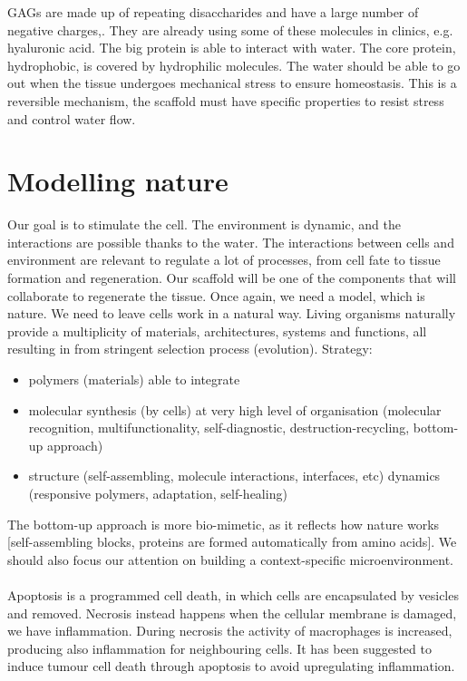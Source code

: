 \noindent
GAGs are made up of repeating disaccharides and have a large number of negative charges,.
They are already using some of these molecules in clinics, e.g. hyaluronic acid.
The big protein is able to interact with water.
The core protein, hydrophobic, is covered by hydrophilic molecules.
The water should be able to go out when the tissue undergoes mechanical stress to ensure homeostasis.
This is a reversible mechanism,  the scaffold must have specific properties to resist stress and control water flow.

\section{Modelling nature}
Our goal is to stimulate the cell.
The environment is dynamic, and the interactions are possible thanks to the water.
The interactions between cells and environment are relevant to regulate a lot of processes, from cell fate to tissue formation and regeneration.
Our scaffold will be one of the components that will collaborate to regenerate the tissue.
Once again, we need a model, which is nature.
We need to leave cells work in a natural way.
Living organisms naturally provide a multiplicity of materials, architectures, systems and functions, all resulting in from stringent selection process (evolution).
\noindent
Strategy:
\begin{itemize}
\item polymers (materials) able to integrate
\item molecular synthesis (by cells) at very high level of organisation (molecular recognition, multifunctionality, self-diagnostic, destruction-recycling, bottom-up approach)
\item structure (self-assembling, molecule interactions, interfaces, etc) dynamics
(responsive polymers, adaptation, self-healing)
\end{itemize}
\noindent
The bottom-up approach is more bio-mimetic,  as it reflects how nature works [self-assembling blocks, proteins are formed automatically from amino acids].
We should also focus our attention on building a context-specific microenvironment.
\\
\\
\noindent
Apoptosis is a programmed cell death, in which cells are encapsulated by vesicles and removed.
Necrosis instead happens when the cellular membrane is damaged, we have inflammation.
During necrosis the activity of macrophages is increased, producing also inflammation for neighbouring cells.
It has been suggested to induce tumour cell death through apoptosis to avoid upregulating inflammation.
